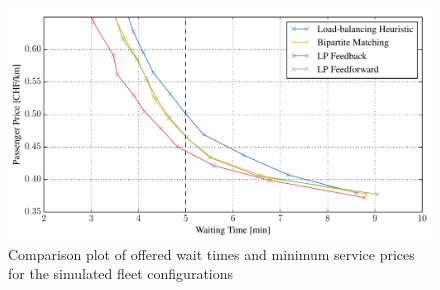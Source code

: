\begin{figure}
\includegraphics[width=1.0\textwidth]{figures/time_vs_price.pdf}
\caption{Comparison plot of offered wait times and minimum service prices for the
simulated fleet configurations}
\label{fig:time_vs_price}
\end{figure}
